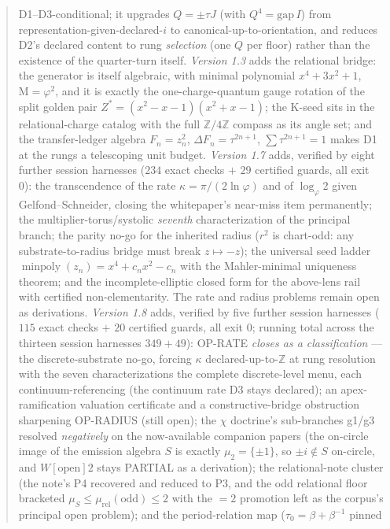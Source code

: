 \documentclass[11pt]{article}
\newcommand{\Z}{\mathbb{Z}}
\newcommand{\gp}{\varphi}
\newcommand{\gapc}{\mathrm{gap}}
\newcommand{\M}{\mathrm{M}}
\theoremstyle{plain}
\theoremstyle{definition}
\theoremstyle{remark}
\begin{document}
\begin{abstract}
D1--D3-conditional; it upgrades $Q=\pm\tau J$ (with $Q^4=\gapc\,I$) from
representation-given-declared-$i$ to canonical-up-to-orientation, and reduces
D2's declared content to rung \emph{selection} (one $Q$ per floor) rather than
the existence of the quarter-turn itself. \emph{Version 1.3} adds the
relational bridge: the generator is itself algebraic, with minimal polynomial
$x^4+3x^2+1$, $\M=\gp^2$, and it is exactly the one-charge-quantum gauge
rotation of the split golden pair $Z^{*}=(x^2{-}x{-}1)(x^2{+}x{-}1)$; the K-seed
sits in the relational-charge catalog with the full $\Z/4\Z$ compass as its
angle set; and the transfer-ledger algebra $F_n=z_n^2$,
$\Delta F_n=\tau^{2n+1}$, $\sum\tau^{2n+1}=1$ makes D1 at the rungs a
telescoping unit budget. \emph{Version 1.7} adds, verified by eight further
session harnesses ($234$ exact checks $+$ $29$ certified guards, all exit 0):
the transcendence of the rate $\kappa=\pi/(2\ln\gp)$ and of $\log_\gp2$ given
Gelfond--Schneider, closing the whitepaper's near-miss item permanently; the
multiplier-torus/systolic \emph{seventh} characterization of the principal
branch; the parity no-go for the inherited radius ($r^2$ is chart-odd: any
substrate-to-radius bridge must break $z\mapsto-z$); the universal seed ladder
$\operatorname{minpoly}(z_n)=x^4+c_nx^2-c_n$ with the Mahler-minimal
uniqueness theorem; and the incomplete-elliptic closed form for the
above-lens rail with certified non-elementarity. The rate and radius problems
remain open as derivations. \emph{Version 1.8} adds, verified by five further
session harnesses ($115$ exact checks $+$ $20$ certified guards, all exit 0;
running total across the thirteen session harnesses $349+49$): OP-RATE
\emph{closes as a classification} --- the discrete-substrate no-go, forcing
$\kappa$ declared-up-to-$\Z$ at rung resolution with the seven characterizations
the complete discrete-level menu, each continuum-referencing (the continuum
rate D3 stays declared); an apex-ramification valuation certificate and a
constructive-bridge obstruction sharpening OP-RADIUS (still open); the $\chi$
doctrine's sub-branches g1/g3 resolved \emph{negatively} on the now-available
companion papers (the on-circle image of the emission algebra $S$ is exactly
$\mu_2=\{\pm1\}$, so $\pm i\notin S$ on-circle, and $W[\text{open}]2$ stays
PARTIAL as a derivation); the relational-note cluster (the note's P4 recovered
and reduced to P3, and the odd relational floor bracketed $\mu_S\le\mu_{\mathrm
{rel}}(\text{odd})\le2$ with the $=2$ promotion left as the corpus's principal
open problem); and the period-relation map ($\tau_0=\beta+\beta^{-1}$ pinned

\end{abstract}
\end{document}
